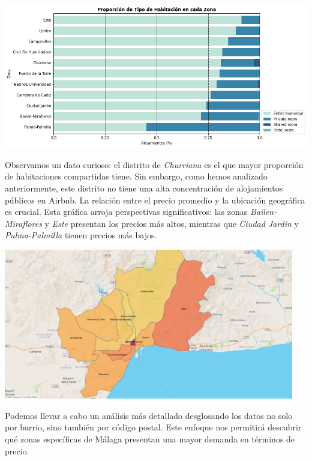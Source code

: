 \begin{center}
    \centering
    \includegraphics[width=1\textwidth]{capturas/8.png}
\end{center}
Observamos un dato curioso: el distrito de \textit{Churriana} es el que mayor proporción de habitaciones compartidas tiene. Sin embargo, como hemos analizado anteriormente, este distrito no tiene una alta concentración de alojamientos públicos en Airbnb.
\newpage
La relación entre el precio promedio y la ubicación geográfica es crucial. Esta gráfica arroja perspectivas significativos: las zonas \textit{Bailen-Miraflores} y \textit{Este} presentan los precios más altos, mientras que \textit{Ciudad Jardin} y \textit{Palma-Palmilla} tienen precios más bajos.
\begin{center}
    \centering
    \includegraphics[width=0.95\textwidth]{capturas/9.png}
\end{center}
Podemos llevar a cabo un análisis más detallado desglosando los datos no solo por barrio, sino también por código postal. Este enfoque nos permitirá descubrir qué zonas específicas de Málaga presentan una mayor demanda en términos de precio.
